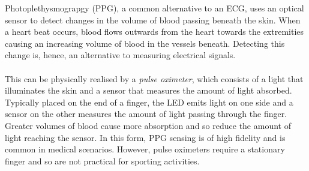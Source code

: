 Photoplethysmograpgy (PPG), a common alternative to an ECG, uses an optical sensor to detect changes in the volume of blood passing beneath the skin.
When a heart beat occurs, blood flows outwards from the heart towards the extremities causing an increasing volume of blood in the vessels beneath.
Detecting this change is, hence, an alternative to measuring electrical signals.
\\\\
This can be physically realised by a \textit{pulse oximeter}, which consists of a light that illuminates the skin and a sensor that measures the amount of light absorbed. 
Typically placed on the end of a finger, the LED emits light on one side and a sensor on the other measures the amount of light passing through the finger.
Greater volumes of blood cause more absorption and so reduce the amount of light reaching the sensor.
In this form, PPG sensing is of high fidelity and is common in medical scenarios. However, pulse oximeters require a stationary finger and so are not practical for sporting activities. 



